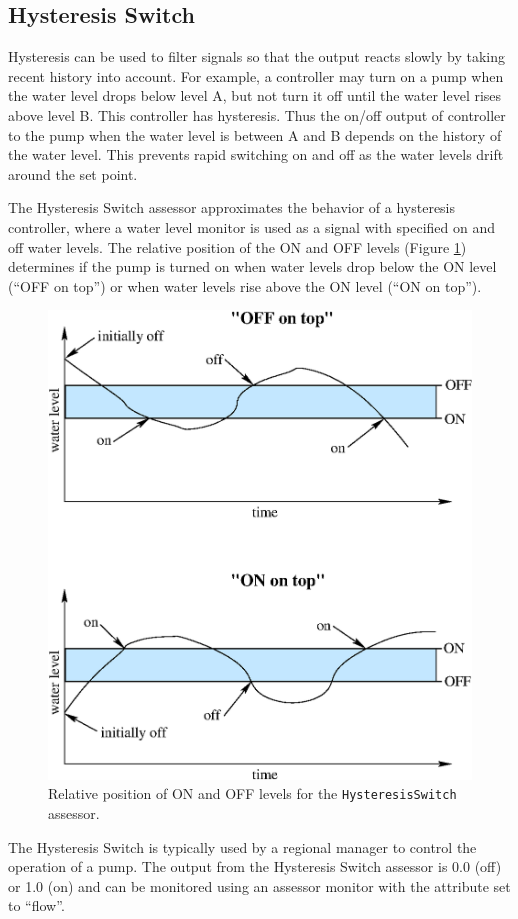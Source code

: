 \subsection{Hysteresis Switch}

Hysteresis can be used to filter signals so that the output reacts
slowly by taking recent history into account.  For example, a
controller may turn on a pump when the water level drops below level
A, but not turn it off until the water level rises above level B.
This controller has hysteresis.  Thus the on/off output of controller
to the pump when the water level is between A and B depends on the
history of the water level.  This prevents rapid switching on and off
as the water levels drift around the set point.

The Hysteresis Switch assessor approximates the behavior of a
hysteresis controller, where a water level monitor is used as a signal
with specified on and off water levels.  The relative position of the
ON and OFF levels (Figure \ref{fig:HysteresisSwitch}) determines if
the pump is turned on when water levels drop below the ON level (``OFF
on top'') or when water levels rise above the ON level (``ON on
top'').

\begin{figure}[!htb]
 \begin{center}
  \includegraphics[scale=.5]{Graphics/hysteresis}
  \caption{\label{fig:HysteresisSwitch} Relative position of ON and OFF levels for the {\tt HysteresisSwitch} assessor.}
 \end{center}
\end{figure}

The Hysteresis Switch is typically used by a regional manager
to control the operation of a pump.  The output from the Hysteresis
Switch assessor is 0.0 (off) or 1.0 (on) and can be monitored using an
assessor monitor with the attribute set to ``flow''.
